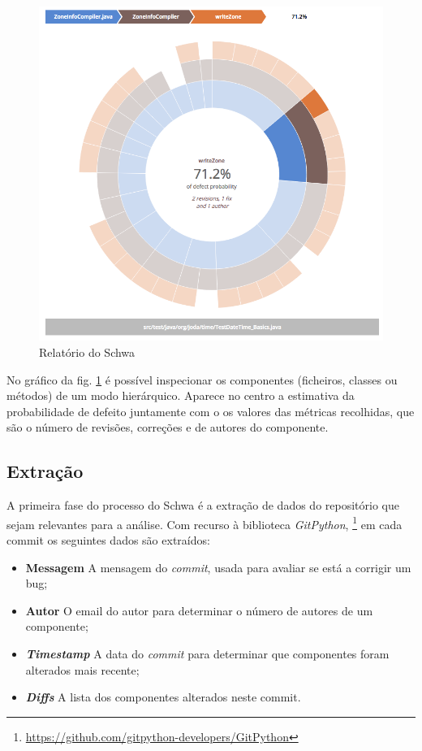 \documentclass[9pt,a4paper]{extarticle}
\begin{document}
\begin{multicols}{2}
\begin{figure}[H]
\centerline{\includegraphics[scale=.25]{sunburst.png}}
\caption{Relatório do Schwa}
\label{fig:sunburst}
\end{figure}

No gráfico da fig. \ref{fig:sunburst} é possível inspecionar os componentes
(ficheiros, classes ou métodos) de um modo hierárquico. Aparece no centro a
estimativa da probabilidade de defeito juntamente com o os valores das métricas
recolhidas, que são o número de revisões, correções e de autores do componente.

\subsection{Extração}
A primeira fase do processo do Schwa é a extração de dados do repositório que
sejam relevantes para a análise. Com recurso à biblioteca \emph{GitPython},
\footnote{\url{https://github.com/gitpython-developers/GitPython}}
em cada commit os seguintes dados são extraídos:

\begin{itemize}
\item  \textbf{Messagem} A mensagem do \emph{commit}, usada para avaliar se está
 a corrigir um bug;
\item  \textbf{Autor} O email do autor para determinar o número de autores de um
componente;
\item  \textbf{\emph{Timestamp}} A data do \emph{commit} para determinar que
componentes foram alterados mais recente;
\item  \textbf{\emph{Diffs}} A lista dos componentes alterados neste commit.
\end{itemize}


\end{multicols}
\end{document}
